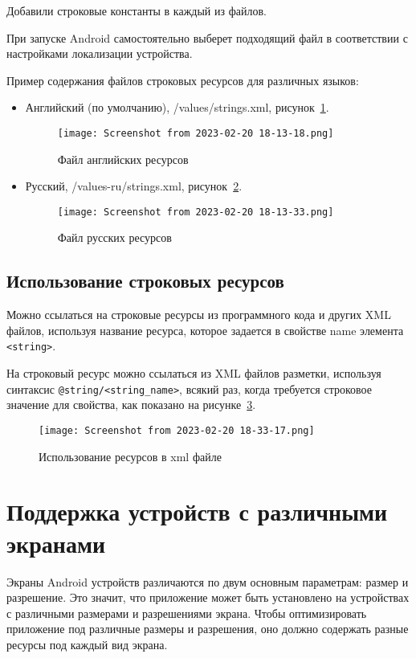Добавили строковые константы в каждый из файлов.\par
При запуске Android самостоятельно выберет подходящий файл в
соответствии с настройками локализации устройства.\par
Пример содержания файлов строковых ресурсов для различных
языков:
\begin{itemize}
	\item Английский (по умолчанию), /values/strings.xml,
		рисунок~\ref{fig:res:values:en}.
		\begin{figure}[h!tp]
			\centering
			\texttt{[image: Screenshot from 2023-02-20 18-13-18.png]}
			\caption{Файл английских ресурсов}
			\label{fig:res:values:en}
		\end{figure}
	\item Русский, /values-ru/strings.xml,
		рисунок~\ref{fig:res:values:ru}.
		\begin{figure}[h!tp]
			\centering
			\texttt{[image: Screenshot from 2023-02-20 18-13-33.png]}
			\caption{Файл русских ресурсов}
			\label{fig:res:values:ru}
		\end{figure}
\end{itemize}

\subsection{Использование строковых ресурсов}
Можно ссылаться на строковые ресурсы из программного кода и других
XML файлов, используя название ресурса, которое задается в свойстве name
элемента \texttt{<string>}.\par
На строковый ресурс можно ссылаться из XML файлов разметки,
используя синтаксис \texttt{@string/<string\_name>}, всякий раз,
когда требуется строковое значение для свойства, как показано
на рисунке~\ref{fig:xml:string}.
\begin{figure}[h!tp]
	\centering
	\texttt{[image: Screenshot from 2023-02-20 18-33-17.png]}
	\caption{Использование ресурсов в xml файле}
	\label{fig:xml:string}
\end{figure}

\section{Поддержка устройств с различными экранами}
Экраны Android устройств различаются по двум основным параметрам:
размер и разрешение. Это значит, что приложение
может быть установлено на устройствах с различными размерами и
разрешениями экрана. Чтобы оптимизировать приложение под различные
размеры и разрешения, оно должно содержать разные ресурсы под каждый
вид экрана.

